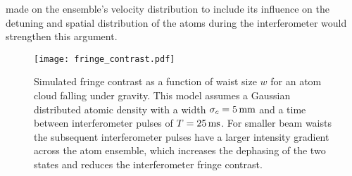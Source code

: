made on the ensemble's velocity distribution to include its influence on the
detuning and spatial distribution of the atoms during the interferometer would
strengthen this argument.
\begin{figure}[!htbp]
	\centering
	\texttt{[image: fringe\_contrast.pdf]}
	\caption[Simulated fringe contrast vs beam waist size]{Simulated fringe
		contrast as a function of waist size \(w\) for an atom cloud falling under
		gravity. This model assumes a Gaussian distributed atomic density with a
		width \(\sigma_c = \sivalue{5}{\milli\metre}\) and a time between
		interferometer pulses of \(T = \sivalue{25}{\milli\second}\). For smaller
		beam waists the subsequent interferometer pulses have a larger intensity
		gradient across the atom ensemble, which increases the dephasing of the two
		states and reduces the interferometer fringe contrast.}
	\label{fig:raman_fringecontrast}
\end{figure}
